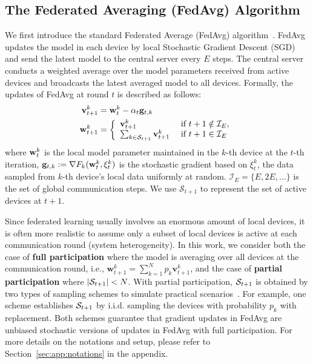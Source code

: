 \subsection{The Federated Averaging (FedAvg) Algorithm}
We first introduce the standard Federated Average (FedAvg) algorithm~\cite{mcmahan2016communication}.
FedAvg updates the model in each device by local Stochastic Gradient Descent (SGD) and send the latest model to the central server every $E$
steps. The central server conducts a weighted average over the model parameters
received from active devices and broadcasts the latest averaged model to all devices.
Formally, the updates of FedAvg at round $t$ is described as follows:
\begin{align}
{\mathbf{v}}_{t+1}^{k} & ={\mathbf{w}}_{t}^{k}-\alpha_{t}{\mathbf{g}}_{t,k}\\
\mathbf{w}_{t+1}^{k} &=\left\{
\begin{array}{ll}
\mathbf{v}_{t+1}^{k} & \text { if } t+1 \notin \mathcal{I}_{E}, \\ 
\sum_{k \in {\mathcal{S}}_{t+1}} \mathbf{v}_{t+1}^{k} & \text { if } t+1 \in \mathcal{I}_{E}
\end{array}\right.
\end{align}
where ${\mathbf{w}}_t^k$ is the local model parameter maintained in the $k$-th device at the $t$-th iteration, ${\mathbf{g}}_{t,k}:=\nabla F_{k}({\mathbf{w}}_{t}^{k},\xi_{t}^{k})$ is the stochastic gradient based on $\xi_{t}^{k}$, the data sampled from $k$-th device’s local data uniformly at random. $\mathcal{I}_{E}=\{E,2E,\dots\}$ is the set of global communication steps. We use $\mathcal{S}_{t+1}$ to represent the set of active devices at $t+1$.

Since federated learning usually involves an enormous amount of 
local devices, it is often more realistic to assume only a subset of 
local devices is active at each communication round (system heterogeneity). In this work,
we consider both the case of \textbf{full participation} where the model is
averaging over all devices at the communication round, i.e.,
$\mathbf{w}_{t+1}^{k} = \sum_{k=1}^N p_k \mathbf{v}_{t+1}^{k}$, and
the case of \textbf{partial participation} where $|{\mathcal{S}}_{t+1}| < N$. 
With partial participation, ${\mathcal{S}}_{t+1}$ is obtained by two types of
sampling schemes to simulate practical scenarios~\cite{li2019convergence}. For example, one scheme establishes ${\mathcal{S}}_{t+1}$ by i.i.d. sampling the devices with probability $p_k$ with replacement. 
Both schemes
guarantee that gradient updates in FedAvg are unbiased stochastic versions of
updates in FedAvg with full participation. For 
more details on the notations and setup, please refer to Section~\ref{sec:app:notations} in the appendix.

